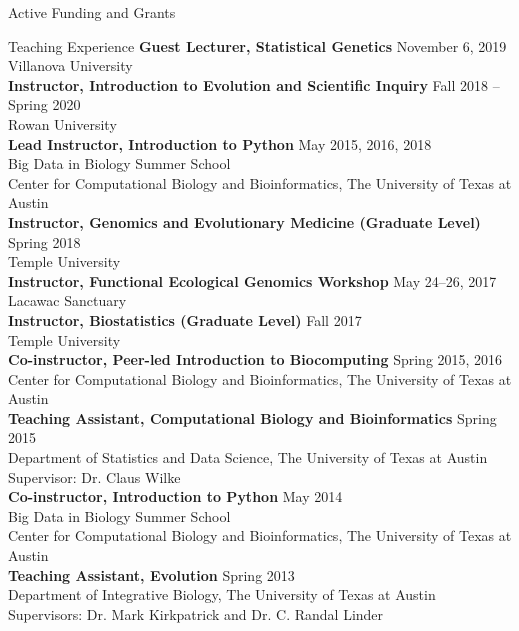 \documentclass{resume} %
\begin{document}
\begin{rSection}{Active Funding and Grants}
\begin{rSection}{Teaching Experience}
\textbf{Guest Lecturer, Statistical Genetics} \hfill November 6, 2019 \\ Villanova University \\ 

\textbf{Instructor, Introduction to Evolution and Scientific Inquiry} \hfill Fall 2018 -- Spring 2020  \\ Rowan University \\

\textbf{Lead Instructor, Introduction to Python} \hfill May 2015, 2016, 2018 \\ Big Data in Biology Summer School \\ Center for Computational Biology and Bioinformatics, The University of Texas at Austin \\

\textbf{Instructor, Genomics and Evolutionary Medicine (Graduate Level)} \hfill Spring 2018 \\ Temple University \\

\textbf{Instructor, Functional Ecological Genomics Workshop} \hfill May 24--26, 2017 \\ Lacawac Sanctuary \\

\textbf{Instructor, Biostatistics (Graduate Level)} \hfill Fall 2017 \\ Temple University \\

\textbf{Co-instructor, Peer-led Introduction to Biocomputing} \hfill Spring 2015, 2016 \\ Center for Computational Biology and Bioinformatics, The University of Texas at Austin \\

\textbf{Teaching Assistant, Computational Biology and Bioinformatics} \hfill Spring 2015 \\ Department of Statistics and Data Science, The University of Texas at Austin \\
Supervisor: Dr. Claus Wilke \\

\textbf{Co-instructor, Introduction to Python} \hfill May 2014 \\ Big Data in Biology Summer School \\ Center for Computational Biology and Bioinformatics, The University of Texas at Austin \\

\textbf{Teaching Assistant, Evolution} \hfill Spring 2013 \\ Department of Integrative Biology, The University of Texas at Austin \\
Supervisors: Dr. Mark Kirkpatrick and Dr. C. Randal Linder \\


\end{rSection}
\end{rSection}
\end{document}

